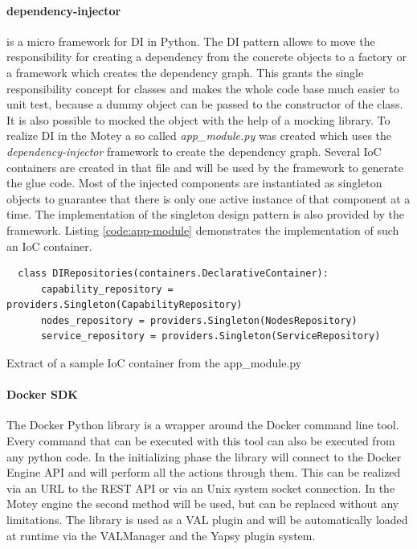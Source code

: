 \paragraph{dependency-injector} is a micro framework for \acf{DI} in Python.
The \ac{DI} pattern allows to move the responsibility for creating a dependency from the concrete objects to a factory or a framework which creates the dependency graph.
This grants the single responsibility concept for classes and makes the whole code base much easier to unit test, because a dummy object can be passed to the constructor of the class.
It is also possible to mocked the object with the help of a mocking library.
To realize \ac{DI} in the Motey a so called \textit{app\_module.py} was created which uses the \textit{dependency-injector} framework to create the dependency graph.
Several \ac{IoC} containers are created in that file and will be used by the framework to generate the glue code.
Most of the injected components are instantiated as singleton objects to guarantee that there is only one active instance of that component at a time.
The implementation of the singleton design pattern is also provided by the framework.
Listing \ref{code:app-module} demonstrates the implementation of such an \ac{IoC} container.
\begin{listing}[H]
  \begin{verbatim}
  class DIRepositories(containers.DeclarativeContainer):
      capability_repository = providers.Singleton(CapabilityRepository)
      nodes_repository = providers.Singleton(NodesRepository)
      service_repository = providers.Singleton(ServiceRepository)
  \end{verbatim}
  \caption{Extract of a sample IoC container from the app\_module.py}
  \label{code:app-module}
\end{listing}

\paragraph{Docker \ac{SDK}}
The Docker Python library is a wrapper around the Docker command line tool.
Every command that can be executed with this tool can also be executed from any python code.
In the initializing phase the library will connect to the Docker Engine \ac{API} and will perform all the actions through them.
This can be realized via an \ac{URL} to the \ac{REST} \ac{API} or via an Unix system socket connection.
In the Motey engine the second method will be used, but can be replaced without any limitations.
The library is used as a \ac{VAL} plugin and will be automatically loaded at runtime via the VALManager and the Yapsy plugin system.

